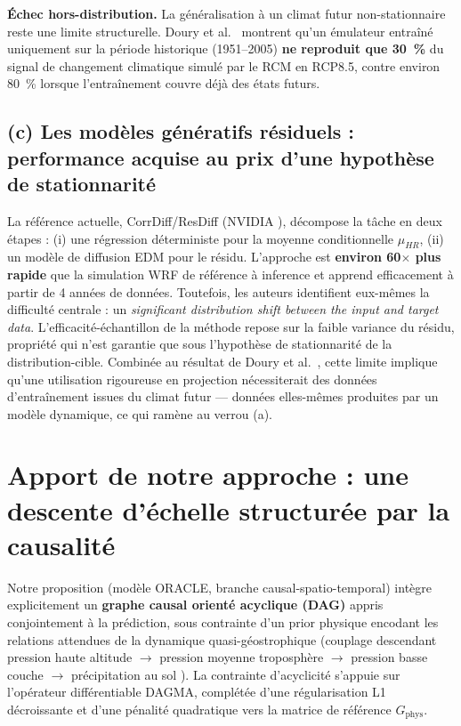 \documentclass[12pt,a4paper]{article}
\begin{document}
\textbf{Échec hors-distribution.} La généralisation à un climat futur non-stationnaire reste une limite structurelle. Doury et al.~\cite{Doury2023} montrent qu'un émulateur entraîné uniquement sur la période historique (1951--2005) \textbf{ne reproduit que 30~\%} du signal de changement climatique simulé par le RCM en RCP8.5, contre environ 80~\% lorsque l'entraînement couvre déjà des états futurs.

\subsection*{(c) Les modèles génératifs résiduels : performance acquise au prix d'une hypothèse de stationnarité}

La référence actuelle, CorrDiff/ResDiff (NVIDIA \cite{Mardani2024}), décompose la tâche en deux étapes : (i) une régression déterministe pour la moyenne conditionnelle $\mu_{HR}$, (ii) un modèle de diffusion EDM pour le résidu. L'approche est \textbf{environ 60$\times$ plus rapide} que la simulation WRF de référence à inference et apprend efficacement à partir de 4 années de données. Toutefois, les auteurs identifient eux-mêmes la difficulté centrale : un \og{}\emph{significant distribution shift between the input and target data}\fg{}. L'efficacité-échantillon de la méthode repose sur la faible variance du résidu, propriété qui n'est garantie que sous l'hypothèse de stationnarité de la distribution-cible. Combinée au résultat de Doury et al.~\cite{Doury2023}, cette limite implique qu'une utilisation rigoureuse en projection nécessiterait des données d'entraînement issues du climat futur --- données elles-mêmes produites par un modèle dynamique, ce qui ramène au verrou (a).

\section{Apport de notre approche : une descente d'échelle structurée par la causalité}

Notre proposition (modèle ORACLE, branche causal-spatio-temporal) intègre explicitement un \textbf{graphe causal orienté acyclique (DAG)} appris conjointement à la prédiction, sous contrainte d'un prior physique encodant les relations attendues de la dynamique quasi-géostrophique (couplage descendant pression haute altitude $\rightarrow$ pression moyenne troposphère $\rightarrow$ pression basse couche $\rightarrow$ précipitation au sol \cite{Holton2013}). La contrainte d'acyclicité s'appuie sur l'opérateur différentiable DAGMA, complétée d'une régularisation L1 décroissante et d'une pénalité quadratique vers la matrice de référence $G_{\text{phys}}$.
\end{document}
